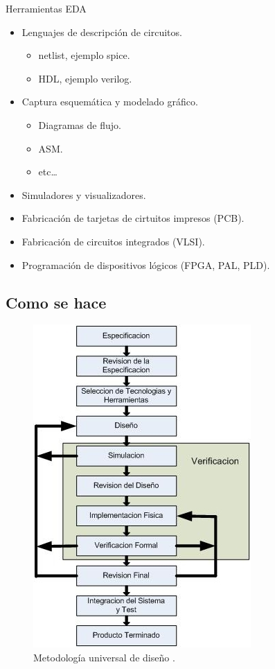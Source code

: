 \documentclass{beamer}
\begin{document}
\begin{frame}{Herramientas EDA}
  \begin{itemize}
  \item Lenguajes de descripción de circuitos.
    \begin{itemize}
    \item netlist, ejemplo spice.
    \item HDL, ejemplo verilog.
    \end{itemize}
    \vspace{9pt}
  \item Captura esquemática y modelado gráfico.
    \begin{itemize}
    \item Diagramas de flujo.
    \item ASM.
    \item etc\dots{}
    \end{itemize}

    \vspace{9pt}
  \item Simuladores y visualizadores.
    \vspace{9pt}
  \item Fabricación de tarjetas de cirtuitos impresos (PCB).
  \item Fabricación de circuitos integrados (VLSI).
  \item Programación de dispositivos lógicos (FPGA, PAL, PLD).
  \end{itemize}
\end{frame}

\subsection{Como se hace}

\begin{frame}
  \begin{figure}
    \includegraphics[scale=0.6]{img/metodologia}
    \caption{Metodología universal de diseño \cite{Guillermo}.}
    \label{fig:metodologia}
  \end{figure}
\end{frame}
\end{document}
